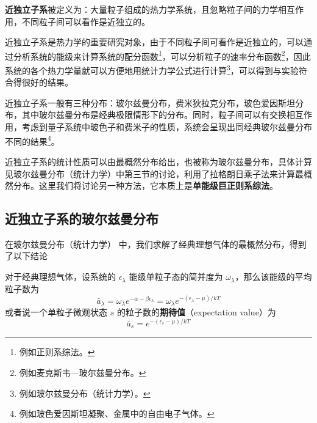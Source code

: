 

\textbf{近独立子系}被定义为：大量粒子组成的热力学系统，且忽略粒子间的力学相互作用，不同粒子间可以看作是近独立的。

近独立子系是热力学的重要研究对象，由于不同粒子间可看作是近独立的，可以通过分析系统的能级来计算系统的配分函数\footnote{例如正则系综法。}，可以分析粒子的速率分布函数\footnote{例如麦克斯韦—玻尔兹曼分布。}，因此系统的各个热力学量就可以方便地用统计力学公式进行计算\footnote{例如玻尔兹曼分布（统计力学）。}，可以得到与实验符合得很好的结果。

近独立子系一般有三种分布：玻尔兹曼分布，费米狄拉克分布，玻色爱因斯坦分布，其中玻尔兹曼分布是经典极限情形下的分布。同时，粒子间可以有交换相互作用，考虑到量子系统中玻色子和费米子的性质，系统会呈现出同经典玻尔兹曼分布不同的结果\footnote{例如玻色爱因斯坦凝聚、金属中的自由电子气体。}。

近独立子系的统计性质可以由最概然分布给出，也被称为玻尔兹曼分布，具体计算见玻尔兹曼分布（统计力学）中第三节的讨论，利用了拉格朗日乘子法来计算最概然分布。这里我们将讨论另一种方法，它本质上是\textbf{单能级巨正则系综法}。

\subsection{近独立子系的玻尔兹曼分布}
在玻尔兹曼分布（统计力学） 中，我们求解了经典理想气体的最概然分布，得到了以下结论
\begin{theorem}{}
对于经典理想气体，设系统的 $\epsilon_\lambda$ 能级单粒子态的简并度为 $\omega_\lambda$，那么该能级的平均粒子数为
\begin{equation}
\bar a_\lambda = \omega_\lambda e^{-\alpha-\beta\epsilon_\lambda}=
\omega_\lambda e^{-(\epsilon_\lambda-\mu)/kT}
\end{equation}
或者说一个单粒子微观状态 $s$ 的粒子数的\textbf{期待值}（expectation value）为
\begin{equation}
\bar a_s= e^{-(\epsilon_s-\mu)/kT}
\end{equation}

\end{theorem}

